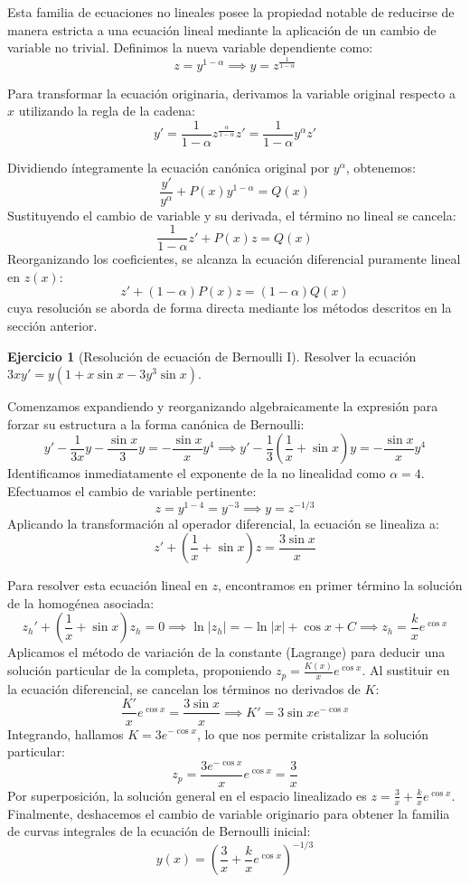 \documentclass[11pt,a4paper]{article}
\theoremstyle{definition}
\newtheorem{exercise}{Ejercicio}[section]
\theoremstyle{plain}
\begin{document}
Esta familia de ecuaciones no lineales posee la propiedad notable de reducirse de manera estricta a una ecuación lineal mediante la aplicación de un cambio de variable no trivial. Definimos la nueva variable dependiente como:
$$ z = y^{1-\alpha} \implies y = z^{\frac{1}{1-\alpha}} $$

Para transformar la ecuación originaria, derivamos la variable original respecto a $x$ utilizando la regla de la cadena:
$$ y' = \frac{1}{1-\alpha} z^{\frac{\alpha}{1-\alpha}} z' = \frac{1}{1-\alpha} y^\alpha z' $$

Dividiendo íntegramente la ecuación canónica original por $y^\alpha$, obtenemos:
$$ \frac{y'}{y^\alpha} + P(x)y^{1-\alpha} = Q(x) $$
Sustituyendo el cambio de variable y su derivada, el término no lineal se cancela:
$$ \frac{1}{1-\alpha} z' + P(x)z = Q(x) $$
Reorganizando los coeficientes, se alcanza la ecuación diferencial puramente lineal en $z(x)$:
$$ z' + (1-\alpha)P(x)z = (1-\alpha)Q(x) $$
cuya resolución se aborda de forma directa mediante los métodos descritos en la sección anterior.

\begin{exercise}[Resolución de ecuación de Bernoulli I]
Resolver la ecuación $3xy' = y(1 + x \sin x - 3y^3 \sin x)$.
\end{exercise}

\begin{tcolorbox}
Comenzamos expandiendo y reorganizando algebraicamente la expresión para forzar su estructura a la forma canónica de Bernoulli:
$$ y' - \frac{1}{3x}y - \frac{\sin x}{3}y = -\frac{\sin x}{x}y^4 \implies y' - \frac{1}{3}\left(\frac{1}{x} + \sin x\right)y = -\frac{\sin x}{x}y^4 $$
Identificamos inmediatamente el exponente de la no linealidad como $\alpha = 4$. Efectuamos el cambio de variable pertinente:
$$ z = y^{1-4} = y^{-3} \implies y = z^{-1/3} $$
Aplicando la transformación al operador diferencial, la ecuación se linealiza a:
$$ z' + \left(\frac{1}{x} + \sin x\right)z = \frac{3\sin x}{x} $$

Para resolver esta ecuación lineal en $z$, encontramos en primer término la solución de la homogénea asociada:
$$ z_h' + \left(\frac{1}{x} + \sin x\right)z_h = 0 \implies \ln|z_h| = -\ln|x| + \cos x + C \implies z_h = \frac{k}{x}e^{\cos x} $$
Aplicamos el método de variación de la constante (Lagrange) para deducir una solución particular de la completa, proponiendo $z_p = \frac{K(x)}{x}e^{\cos x}$. Al sustituir en la ecuación diferencial, se cancelan los términos no derivados de $K$:
$$ \frac{K'}{x}e^{\cos x} = \frac{3\sin x}{x} \implies K' = 3\sin x e^{-\cos x} $$
Integrando, hallamos $K = 3e^{-\cos x}$, lo que nos permite cristalizar la solución particular:
$$ z_p = \frac{3e^{-\cos x}}{x}e^{\cos x} = \frac{3}{x} $$
Por superposición, la solución general en el espacio linealizado es $z = \frac{3}{x} + \frac{k}{x}e^{\cos x}$.
Finalmente, deshacemos el cambio de variable originario para obtener la familia de curvas integrales de la ecuación de Bernoulli inicial:
$$ y(x) = \left( \frac{3}{x} + \frac{k}{x}e^{\cos x} \right)^{-1/3} $$
\end{tcolorbox}
\end{document}
